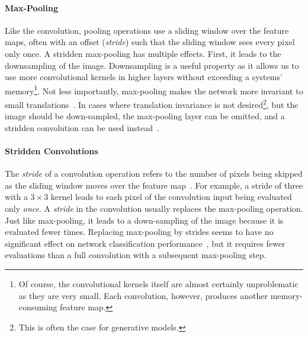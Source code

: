 \paragraph{Max-Pooling}
Like the convolution, pooling operations use a sliding window over the feature maps, often with an offset (\textit{stride}) such that the sliding window sees every pixel only once.
A stridden max-pooling has multiple effects.
First, it leads to the downsampling of the image.
Downsampling is a useful property as it allows us to use more convolutional kernels in higher layers without exceeding a systems' memory\footnote{Of course, the convolutional kernels itself are almost certainly unproblematic as they are very small. Each convolution, however, produces another memory-consuming feature map.}.
Not less importantly, max-pooling makes the network more invariant to small translations~\citep[p. 342]{Goodfellow-et-al-2016}.
In cases where translation invariance is not desired\footnote{This is often the case for generative models.}, but the image should be down-sampled, the max-pooling layer can be omitted, and a stridden convolution can be used instead~\citep[p. 337]{Goodfellow-et-al-2016}.

\paragraph{Stridden Convolutions}
The \textit{stride} of a convolution operation refers to the number of pixels being skipped as the sliding window moves over the feature map~\citep[p. 348]{Goodfellow-et-al-2016}.
For example, a stride of three with a $3\times 3$ kernel leads to each pixel of the convolution input being evaluated only \textit{once}.
A \textit{stride} in the convolution usually replaces the max-pooling operation.
Just like max-pooling, it leads to a down-sampling of the image because it is evaluated fewer times.
Replacing max-pooling by strides seems to have no significant effect on network classification performance~\citep{springenberg2015striving}, but it requires fewer evaluations than a full convolution with a subsequent max-pooling step.

